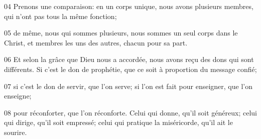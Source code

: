 
04 Prenons une comparaison: en un corps unique, nous avons plusieurs membres, qui n’ont pas tous la même fonction;

05 de même, nous qui sommes plusieurs, nous sommes un seul corps dans le Christ, et membres les uns des autres, chacun pour sa part.

06 Et selon la grâce que Dieu nous a accordée, nous avons reçu des dons qui sont différents. Si c’est le don de prophétie, que ce soit à proportion du message confié;

07 si c’est le don de servir, que l’on serve; si l’on est fait pour enseigner, que l’on enseigne;

08 pour réconforter, que l’on réconforte. Celui qui donne, qu’il soit généreux; celui qui dirige, qu’il soit empressé; celui qui pratique la miséricorde, qu’il ait le sourire.
